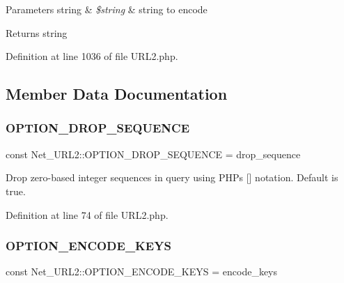 \begin{DoxyParams}[1]{Parameters}
string & {\em \$string} & string to encode\\
\hline
\end{DoxyParams}
\begin{DoxyReturn}{Returns}
string 
\end{DoxyReturn}


Definition at line 1036 of file U\+R\+L2.\+php.



\subsection{Member Data Documentation}
\hypertarget{classNet__URL2_af415684f1d85246c1132203142b86499}{}\label{classNet__URL2_af415684f1d85246c1132203142b86499} 
\subsubsection{\texorpdfstring{O\+P\+T\+I\+O\+N\+\_\+\+D\+R\+O\+P\+\_\+\+S\+E\+Q\+U\+E\+N\+CE}{OPTION\_DROP\_SEQUENCE}}
{\footnotesize\ttfamily const Net\+\_\+\+U\+R\+L2\+::\+O\+P\+T\+I\+O\+N\+\_\+\+D\+R\+O\+P\+\_\+\+S\+E\+Q\+U\+E\+N\+CE = \textquotesingle{}drop\+\_\+sequence\textquotesingle{}}

Drop zero-\/based integer sequences in query using P\+HP\textquotesingle{}s \mbox{[}\mbox{]} notation. Default is true. 

Definition at line 74 of file U\+R\+L2.\+php.

\hypertarget{classNet__URL2_ae06ebc991de4ffe92644c5a8d37ad5ac}{}\label{classNet__URL2_ae06ebc991de4ffe92644c5a8d37ad5ac} 
\subsubsection{\texorpdfstring{O\+P\+T\+I\+O\+N\+\_\+\+E\+N\+C\+O\+D\+E\+\_\+\+K\+E\+YS}{OPTION\_ENCODE\_KEYS}}
{\footnotesize\ttfamily const Net\+\_\+\+U\+R\+L2\+::\+O\+P\+T\+I\+O\+N\+\_\+\+E\+N\+C\+O\+D\+E\+\_\+\+K\+E\+YS = \textquotesingle{}encode\+\_\+keys\textquotesingle{}}

